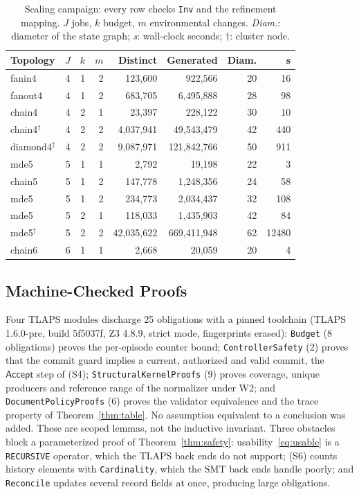 \documentclass[pdflatex,sn-mathphys-num]{sn-jnl}
\theoremstyle{thmstyleone}%
\theoremstyle{thmstyletwo}%
\theoremstyle{thmstylethree}%
\newcommand{\Acc}{\mathsf{Accept}}
\newcommand{\ProvedObligations}{25}
\begin{document}
\begin{table}[!ht]
\caption{Scaling campaign: every row checks \texttt{Inv} and the refinement mapping. $J$ jobs, $k$ budget, $m$ environmental changes. \emph{Diam.}: diameter of the state graph; \emph{s}: wall-clock seconds; $\dagger$: cluster node.}\label{tab:tlc-scaling}
\footnotesize\setlength{\tabcolsep}{4pt}
\begin{tabular}{@{}lrrrrrrr@{}}\toprule
Topology & $J$ & $k$ & $m$ & Distinct & Generated & Diam. & s\\\midrule
fanin4 & 4 & 1 & 2 & 123,600 & 922,566 & 20 & 16 \\
fanout4 & 4 & 1 & 2 & 683,705 & 6,495,888 & 28 & 98 \\
chain4 & 4 & 2 & 1 & 23,397 & 228,122 & 30 & 10 \\
chain4$^\dagger$ & 4 & 2 & 2 & 4,037,941 & 49,543,479 & 42 & 440 \\
diamond4$^\dagger$ & 4 & 2 & 2 & 9,087,971 & 121,842,766 & 50 & 911 \\
mde5 & 5 & 1 & 1 & 2,792 & 19,198 & 22 & 3 \\
chain5 & 5 & 1 & 2 & 147,778 & 1,248,356 & 24 & 58 \\
mde5 & 5 & 1 & 2 & 234,773 & 2,034,437 & 32 & 108 \\
mde5 & 5 & 2 & 1 & 118,033 & 1,435,903 & 42 & 84 \\
mde5$^\dagger$ & 5 & 2 & 2 & 42,035,622 & 669,411,948 & 62 & 12480 \\
chain6 & 6 & 1 & 1 & 2,668 & 20,059 & 20 & 4 \\
\bottomrule
\end{tabular}
\end{table}

\subsection{Machine-Checked Proofs}
Four TLAPS modules discharge \ProvedObligations{} obligations with a pinned toolchain (TLAPS 1.6.0-pre, build 5f5037f, Z3 4.8.9, strict mode, fingerprints erased): \texttt{Budget} (8 obligations) proves the per-episode counter bound; \texttt{ControllerSafety} (2) proves that the commit guard implies a current, authorized and valid commit, the $\Acc$ step of (S4); \texttt{StructuralKernelProofs} (9) proves coverage, unique producers and reference range of the normalizer under W2; and \texttt{DocumentPolicyProofs} (6) proves the validator equivalence and the trace property of Theorem~\ref{thm:table}. No assumption equivalent to a conclusion was added. These are scoped lemmas, not the inductive invariant. Three obstacles block a parameterized proof of Theorem~\ref{thm:safety}: usability~\eqref{eq:usable} is a \texttt{RECURSIVE} operator, which the TLAPS back ends do not support; (S6) counts history elements with \texttt{Cardinality}, which the SMT back ends handle poorly; and \texttt{Reconcile} updates several record fields at once, producing large obligations.
\end{document}
